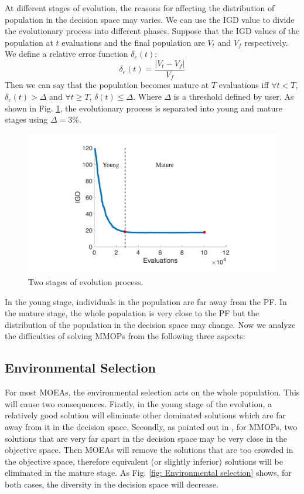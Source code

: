 \documentclass[conference]{IEEEtran}
\begin{document}
At different stages of evolution, the reasons for affecting the distribution of population in the decision space may varies. We can use the IGD\cite{zhang2008rm} value to divide the evolutionary process into different phases. Suppose that the IGD values of the population at $t$ evaluations and the final population are $V_t$ and $V_f$ respectively. We define a relative error function $\delta_e(t)$:
$$\delta_e(t)=\frac{|V_t-V_f|}{V_f}$$
Then we can say that the population becomes mature at $T$ evaluations iff $\forall t<T$, $\delta_e(t)>\Delta$ and $\forall t \ge T$, $\delta(t) \leq \Delta$. Where $\Delta$ is a threshold defined by user. As shown in Fig. \ref{fig: Two stages}, the evolutionary process is separated into young and mature stages using $\Delta=3\%$.
\begin{figure}[htbp]
    \centering
    \includegraphics[width=.3\textwidth]{Section3/Stages}
    \caption{Two stages of evolution process.}
    \label{fig: Two stages}
\end{figure}

In the young stage, individuals in the population are far away from the PF. In the mature stage, the whole population is very close to the PF but the distribution of the population in the decision space may change. Now we analyze the difficulties of solving MMOPs from the following three aspects:

\subsection{Environmental Selection}
\label{Impact of environmental selection}
For most MOEAs, the environmental selection acts on the whole population. This will cause two consequences.
Firstly, in the young stage of the evolution, a relatively good solution will eliminate other dominated solutions which are far away from it in the decision space. Secondly, as pointed out in \cite{liang2016multimodal}, for MMOPs, two solutions that are very far apart in the decision space may be very close in the objective space. Then MOEAs will remove the solutions that are too crowded in the objective space, therefore equivalent (or slightly inferior) solutions will be eliminated in the mature stage. As Fig. \ref{fig: Environmental selection} shows, for both cases, the diversity in the decision space will decrease. 
\end{document}
